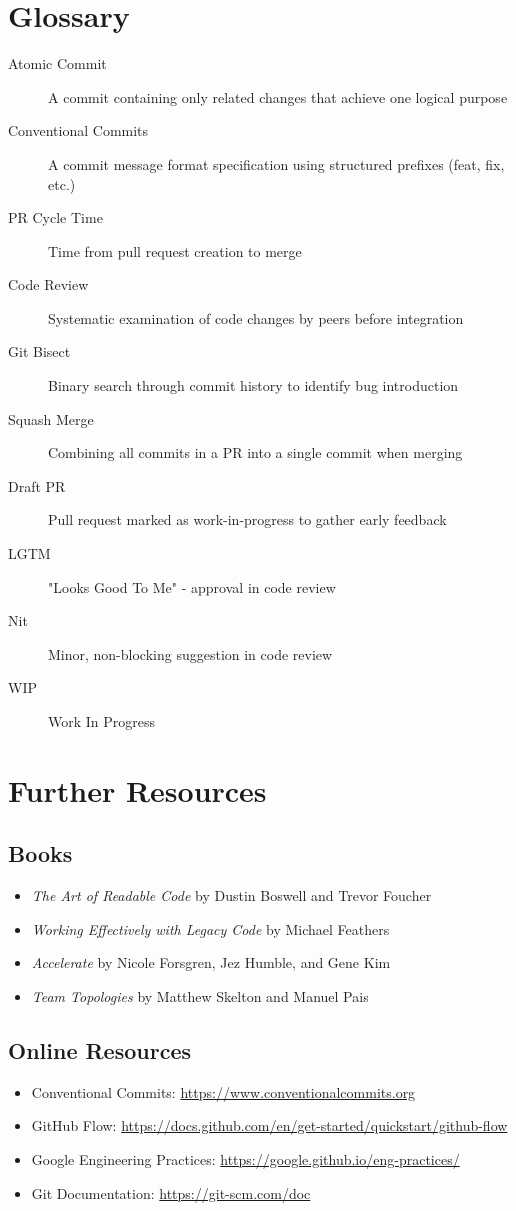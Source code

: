 \documentclass[11pt,openany]{book}
\begin{document}
\chapter{Glossary}

\begin{description}
  \item[Atomic Commit] A commit containing only related changes that achieve one logical purpose
  \item[Conventional Commits] A commit message format specification using structured prefixes (feat, fix, etc.)
  \item[PR Cycle Time] Time from pull request creation to merge
  \item[Code Review] Systematic examination of code changes by peers before integration
  \item[Git Bisect] Binary search through commit history to identify bug introduction
  \item[Squash Merge] Combining all commits in a PR into a single commit when merging
  \item[Draft PR] Pull request marked as work-in-progress to gather early feedback
  \item[LGTM] "Looks Good To Me" - approval in code review
  \item[Nit] Minor, non-blocking suggestion in code review
  \item[WIP] Work In Progress
\end{description}

\chapter{Further Resources}

\section{Books}
\begin{itemize}
  \item \textit{The Art of Readable Code} by Dustin Boswell and Trevor Foucher
  \item \textit{Working Effectively with Legacy Code} by Michael Feathers
  \item \textit{Accelerate} by Nicole Forsgren, Jez Humble, and Gene Kim
  \item \textit{Team Topologies} by Matthew Skelton and Manuel Pais
\end{itemize}

\section{Online Resources}
\begin{itemize}
  \item Conventional Commits: \url{https://www.conventionalcommits.org}
  \item GitHub Flow: \url{https://docs.github.com/en/get-started/quickstart/github-flow}
  \item Google Engineering Practices: \url{https://google.github.io/eng-practices/}
  \item Git Documentation: \url{https://git-scm.com/doc}
\end{itemize}
\end{document}
